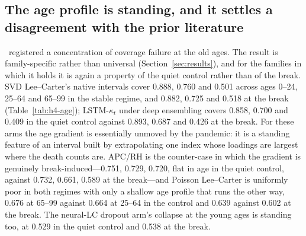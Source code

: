 \subsection{The age profile is standing, and it settles a disagreement with the prior literature}
\label{sec:discussion-age}

\Hfour\ registered a concentration of coverage failure at the old ages.
The result is family-specific rather than universal
(Section~\ref{sec:results}), and for the families in which it holds it is
again a property of the quiet control rather than of the break. SVD
Lee--Carter's native intervals cover 0.888, 0.760 and 0.501 across ages
0--24, 25--64 and 65--99 in the stable regime, and 0.882, 0.725 and
0.518 at the break (Table~\ref{tab:h4-age}); LSTM-$\kappa_t$ under deep
ensembling covers 0.858, 0.700 and 0.409 in the quiet control against
0.893, 0.687 and 0.426 at the break. For these arms the age gradient is
essentially unmoved by the pandemic: it is a standing feature of an
interval built by extrapolating one index whose loadings are largest
where the death counts are. APC/RH is the counter-case in which the
gradient is genuinely break-induced---0.751, 0.729, 0.720, flat in age in
the quiet control, against 0.732, 0.661, 0.589 at the break---and
Poisson Lee--Carter is uniformly poor in both regimes with only a shallow
age profile that runs the other way, 0.676 at 65--99 against 0.664 at
25--64 in the control and 0.639 against 0.602 at the break. The neural-LC
dropout arm's collapse at the young ages is standing too, at 0.529 in the
quiet control and 0.538 at the break.

